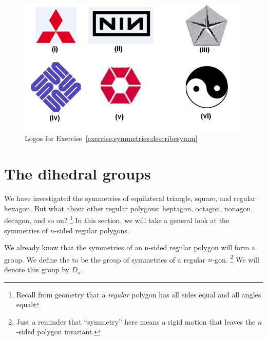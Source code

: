\begin{figure}
\begin{center}
\includegraphics[scale=0.35]{images/logos.png}
\caption{Logos for Exercise~\ref{exercise:symmetries:describesymm}}
\label{logos}
\end{center}
\end{figure}

\section{The dihedral groups}\label{sec:dihedral}

We have investigated the symmetries of equilateral triangle, square, and regular hexagon. But what about other regular polygons: heptagon, octagon, nonagon, decagon, and so on?
\footnote{Recall from geometry that a \emph{regular} polygon has all sides equal and all angles equal}
In this section, we will  take a general look at the symmetries of $n$-sided regular polygons. 

We already know that the symmetries of an n-sided regular polygon will form a group. We define the  to be the group of 
symmetries of a regular $n$-gon.
\footnote{Just a reminder that ``symmetry'' here means a rigid motion that leaves the $n$-sided polygon invariant.}
  We will denote this group by
$D_n$\label{dihedralgroup}.  

